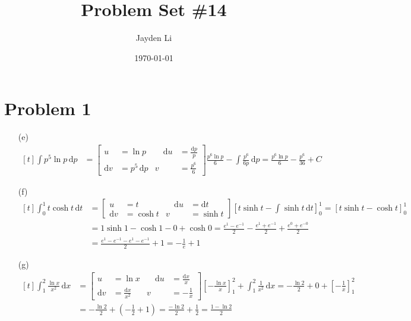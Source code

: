 \documentclass[preview, margin=0.6in]{standalone}
\title{\vspace*{-30pt}Problem Set \#14}
\author{Jayden Li}
\date{\today}
\newcommand*{\problem}[1]{\section*{Problem #1}}
\begin{document}
\fontsize{12pt}{12pt}\selectfont
\maketitle
\problem{1}
\begin{itemize}
	\item[(e)]
		$\begin{aligned}[t]
		    \int p^5\ln p\,\mathrm{d}p
			&=\left[\begin{alignedat}{2}
				u&=\ln p &\quad \mathrm{d}u&=\frac{\mathrm{d}p}{p} \\
				\mathrm{d}v&=p^5 \,\mathrm{d}p & v&=\frac{p^6}{6}
			\end{alignedat}\right]
			\frac{p^6\ln p}{6}-\int \frac{p^6}{6p}\,\mathrm{d}p
			=\boxed{\frac{p^6\ln p}{6}-\frac{p^6}{36}+C}
		\end{aligned}$

	\item[(f)]
		$\begin{aligned}[t]
			\int_{0}^{1}t\cosh t\,\mathrm{d}t
			&=\left[\begin{alignedat}{2}
				u&=t &\quad \mathrm{d}u&=\mathrm{d}t \\
				\mathrm{d}v&=\cosh t & v&=\sinh t
			\end{alignedat}\right]
			\left[t\sinh t-\int \sinh t\,\mathrm{d}t\right]_{0}^{1}
			=\left[t\sinh t-\cosh t\right]_{0}^{1} \\
			&=1\sinh1-\cosh1-0+\cosh0
			=\frac{e^1-e^{-1}}{2}-\frac{e^1+e^{-1}}{2}+\frac{e^0+e^{-0}}{2} \\
			&=\frac{e^1-e^{-1}-e^1-e^{-1}}{2}+1
			=\boxed{-\frac{1}{e}+1}
		\end{aligned}$

	\item[(g)]
		$\begin{aligned}[t]
		    \int_{1}^{2}\frac{\ln x}{x^2}\,\mathrm{d}x
			&=\left[\begin{alignedat}{2}
				u&=\ln x &\quad \mathrm{d}u&=\frac{\mathrm{d}x}{x} \\
				\mathrm{d}v&=\frac{\mathrm{d}x}{x^2} & v&=-\frac{1}{x}
			\end{alignedat}\right]
			\left[-\frac{\ln x}{x}\right]_{1}^{2}+\int_{1}^{2}\frac{1}{x^2}\,\mathrm{d}x
			=-\frac{\ln2}{2}+0+\left[-\frac{1}{x}\right]_{1}^{2} \\
			&=-\frac{\ln2}{2}+\left(-\frac12+1\right)
			=\frac{-\ln2}{2}+\frac12=\boxed{\frac{1-\ln2}{2}}
		\end{aligned}$
\end{itemize}
\end{document}
